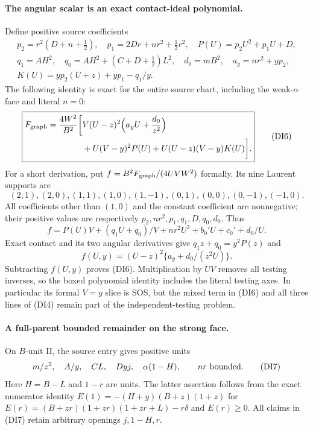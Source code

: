 \paragraph{The angular scalar is an exact contact-ideal polynomial.}
Define positive source coefficients
\[
\begin{gathered}
 p_2=r^2(D+n+\tfrac12),\quad
 p_1=2Dr+nr^2+\tfrac12r^2,\quad
 P(U)=p_2U^2+p_1U+D,\\
 q_1=AH^2,\quad q_0=AH^2+(C+D+\tfrac12)L^2,\quad
 d_0=mB^2,\quad a_y=nr^2+yp_2,\\
 K(U)=yp_2(U+z)+yp_1-q_1/y.
\end{gathered}
\]
The following identity is exact for the entire source chart, including
the weak-$\alpha$ face and literal $n=0$:
\[
\boxed{\begin{aligned}
 F_{\rm graph}=\frac{4W^2}{B^2}\biggl[&
 V(U-z)^2\Bigl(a_yU+\frac{d_0}{z^2}\Bigr)
 \\
 &+U(V-y)^2P(U)+U(U-z)(V-y)K(U)\biggr].
 \end{aligned}}                                      \tag{DI6}
\]
For a short derivation, put $f=B^2F_{\rm graph}/(4UV W^2)$ formally.
Its nine Laurent supports are
\[
 (2,1),(2,0),(1,1),(1,0),(1,-1),(0,1),(0,0),(0,-1),(-1,0).
\]
All coefficients other than $(1,0)$ and the constant coefficient are
nonnegative; their positive values are respectively
$p_2,nr^2,p_1,q_1,D,q_0,d_0$.
Thus
\[
 f=P(U)V+(q_1U+q_0)/V+nr^2U^2+b_0'U+c_0'+d_0/U.
\]
Exact contact and its two angular derivatives give
$q_1z+q_0=y^2P(z)$ and
\[
 f(U,y)=(U-z)^2\{a_y+d_0/(z^2U)\}.
\]
Subtracting $f(U,y)$ proves (DI6).  Multiplication by $UV$ removes
all testing inverses, so the boxed polynomial identity includes the
literal testing axes.  In particular its formal $V=y$ slice is SOS,
but the mixed term in (DI6) and all three lines of (DI4) remain part
of the independent-testing problem.

\paragraph{A full-parent bounded remainder on the strong face.}
On $B$-unit II, the source entry gives positive units
\[
 m/z^2,\quad A/y,\quad CL,\quad Dyj,\quad
 \alpha(1-H),\qquad nr\ \hbox{bounded}.              \tag{DI7}
\]
Here $H=B-L$ and $1-r$ are units.  The latter assertion follows from
the exact numerator identity
$E(1)=-(H+y)(B+z)(1+z)$ for
$E(r)=(B+zr)(1+zr)(1+zr+L)-r\delta$ and $E(r)\ge0$.
All claims in (DI7) retain arbitrary openings $j,1-H,r$.


